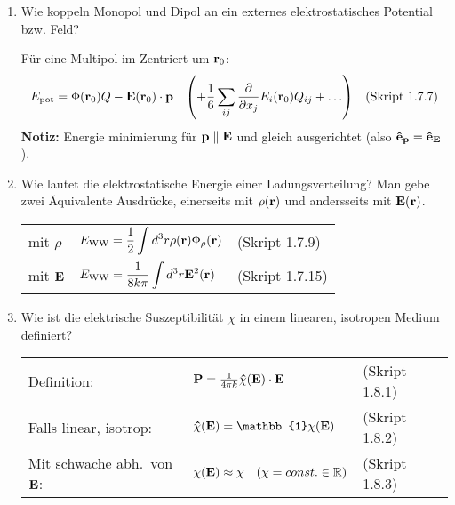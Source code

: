 \begin{enumerate}
  \item Wie koppeln Monopol und Dipol an ein externes elektrostatisches
        Potential bzw. Feld?
        
        Für eine Multipol im Zentriert um $\vb r_0$:
        $$E_{\text{pot}}=\Phi(\vb r_0)Q-\vb E(\vb r_0)\cdot\vb p 
        \quad\qty(+ \frac{1}{6}\sum_{ij}\pdv{x_j}E_i(\vb r_0)Q_{ij}
        +\ldots)
        \quad\text{(Skript 1.7.7)}$$
        \textbf{Notiz:} Energie minimierung für $\vb p\parallel \vb E$
        und gleich ausgerichtet (also $\vu e_{\vb p}=\vu e_{\vb E}$).\\

  \item Wie lautet die elektrostatische Energie einer Ladungsverteilung?
        Man gebe zwei Äquivalente Ausdrücke, einerseits mit $\rho(\vb r)$
        und andersseits mit $\vb E(\vb r)$.
        \begin{center}
        \begin{tabular}{lll}
          mit $\rho$    & $\displaystyle E_{\text{WW}}=
                          \frac{1}{2}\int d^3 r\rho(\vb r)
                          \Phi_\rho(\vb r)$
                            &(Skript 1.7.9)\\
          mit $\vb E$   & $\displaystyle E_{\text{WW}}=\frac{1}{8k\pi}
                           \int d^3 r\vb E^2(\vb r)$
                            &(Skript 1.7.15)\\
        \end{tabular}
        \end{center}

  \clearpage
  \item Wie ist die elektrische Suszeptibilität $\chi$ in einem 
        linearen, isotropen Medium definiert?
        \begin{center}
        \begin{tabular}{lll}
          Definition:             
          & $\vb P = \frac{1}{4\pi k} 
            \vu \chi(\vb E)\cdot \vb E\quad$
          & (Skript 1.8.1) \\
          Falls linear, isotrop: 
          & $\vu\chi(\vb E)=
            \mathbb{1}\chi(\vb E)$
              & (Skript 1.8.2) \\
          Mit schwache abh.\ von $\vb E$:
                                  & $\chi(\vb E)\approx\chi
                                  \quad(\chi=const.\in\mathbb{R})$
                                    & (Skript 1.8.3) \\
          

\end{tabular}
\end{center}
\end{enumerate}
